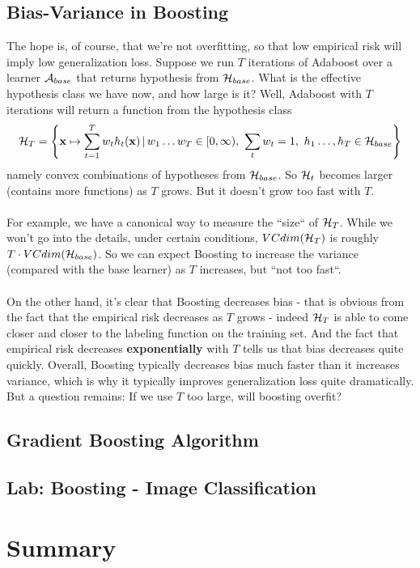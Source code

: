 \subsection{Bias-Variance in Boosting}
The hope is, of course, that we're not overfitting, so that low empirical risk will imply low generalization loss. Suppose we run $T$ iterations of Adaboost over a learner $\mathcal{A}_{base}$ that returns hypothesis from $\mathcal{H}_{base}$. What is the effective hypothesis class we have now, and how large is it? Well, Adaboost with $T$ iterations will return a function from the hypothesis class  
$$\mathcal{H}_T = \left\{ \mathbf{x}\mapsto \sum_{t=1}^Tw_t h_t(\mathbf{x}) \,| \, w_1\ldots w_T\in[0,\infty),\,\, \sum_t w_t=1,\,\, h_1\ldots,h_T\in\mathcal{H}_{base}\right\}$$
namely convex combinations of hypotheses from $\mathcal{H}_{base}$. So $\mathcal{H}_t$ becomes larger (contains more functions) as $T$ grows. But it doesn't grow too fast with $T$. 
\\~\\
For example, we have a canonical way to measure the ``size`` of $\mathcal{H}_T$. While we won't go into the details, under certain conditions, $VCdim(\mathcal{H}_T)$ is roughly $T\cdot VCdim(\mathcal{H}_{base})$. So we can expect Boosting to increase the variance (compared with the base learner) as $T$ increases, but ``not too fast``. 
\\~\\
On the other hand, it's clear that Boosting decreases bias - that is obvious from the fact that the empirical risk decreases as $T$ grows - indeed $\mathcal{H}_T$ is able to come closer and closer to the labeling function on the training set. And the fact that empirical risk decreases \textbf{exponentially} with $T$ tells us that bias decreases quite quickly. Overall, Boosting typically decreases bias much faster than it increases variance, which is why it typically improves generalization loss quite dramatically. But a question remains: If we use $T$ too large, will boosting overfit? 

\subsection{Gradient Boosting Algorithm}
\subsection{Lab: Boosting - Image Classification}


\section{Summary}
